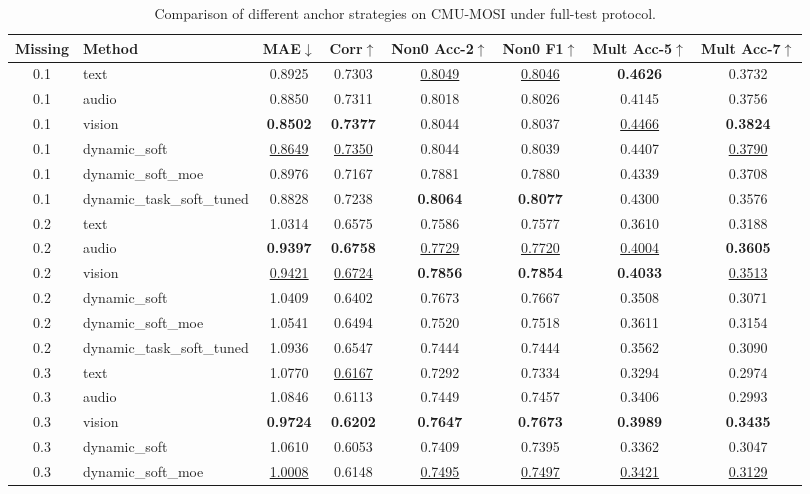 \begin{table}[t]
\centering
\caption{Comparison of different anchor strategies on CMU-MOSI under full-test protocol.}
\begin{tabular}{c l c c c c c c}
\toprule
Missing & Method & MAE$\downarrow$ & Corr$\uparrow$ & Non0 Acc-2$\uparrow$ & Non0 F1$\uparrow$ & Mult Acc-5$\uparrow$ & Mult Acc-7$\uparrow$ \\
\midrule
0.1 & text & 0.8925 & 0.7303 & \underline{0.8049} & \underline{0.8046} & \textbf{0.4626} & 0.3732 \\
0.1 & audio & 0.8850 & 0.7311 & 0.8018 & 0.8026 & 0.4145 & 0.3756 \\
0.1 & vision & \textbf{0.8502} & \textbf{0.7377} & 0.8044 & 0.8037 & \underline{0.4466} & \textbf{0.3824} \\
0.1 & dynamic_soft & \underline{0.8649} & \underline{0.7350} & 0.8044 & 0.8039 & 0.4407 & \underline{0.3790} \\
0.1 & dynamic_soft_moe & 0.8976 & 0.7167 & 0.7881 & 0.7880 & 0.4339 & 0.3708 \\
0.1 & dynamic_task_soft_tuned & 0.8828 & 0.7238 & \textbf{0.8064} & \textbf{0.8077} & 0.4300 & 0.3576 \\
\midrule
0.2 & text & 1.0314 & 0.6575 & 0.7586 & 0.7577 & 0.3610 & 0.3188 \\
0.2 & audio & \textbf{0.9397} & \textbf{0.6758} & \underline{0.7729} & \underline{0.7720} & \underline{0.4004} & \textbf{0.3605} \\
0.2 & vision & \underline{0.9421} & \underline{0.6724} & \textbf{0.7856} & \textbf{0.7854} & \textbf{0.4033} & \underline{0.3513} \\
0.2 & dynamic_soft & 1.0409 & 0.6402 & 0.7673 & 0.7667 & 0.3508 & 0.3071 \\
0.2 & dynamic_soft_moe & 1.0541 & 0.6494 & 0.7520 & 0.7518 & 0.3611 & 0.3154 \\
0.2 & dynamic_task_soft_tuned & 1.0936 & 0.6547 & 0.7444 & 0.7444 & 0.3562 & 0.3090 \\
\midrule
0.3 & text & 1.0770 & \underline{0.6167} & 0.7292 & 0.7334 & 0.3294 & 0.2974 \\
0.3 & audio & 1.0846 & 0.6113 & 0.7449 & 0.7457 & 0.3406 & 0.2993 \\
0.3 & vision & \textbf{0.9724} & \textbf{0.6202} & \textbf{0.7647} & \textbf{0.7673} & \textbf{0.3989} & \textbf{0.3435} \\
0.3 & dynamic_soft & 1.0610 & 0.6053 & 0.7409 & 0.7395 & 0.3362 & 0.3047 \\
0.3 & dynamic_soft_moe & \underline{1.0008} & 0.6148 & \underline{0.7495} & \underline{0.7497} & \underline{0.3421} & \underline{0.3129} \\

\end{tabular}
\end{table}
